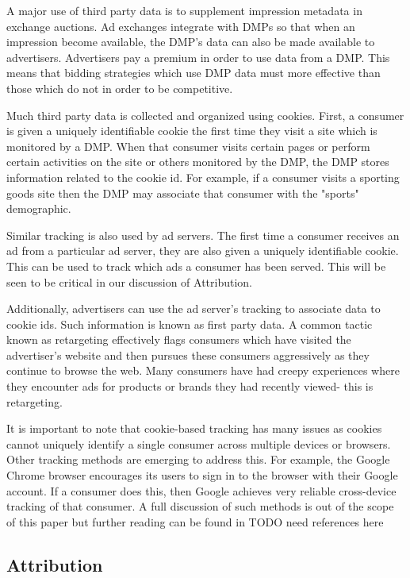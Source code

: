 \documentclass{article}
\begin{document}
A major use of third party data is to supplement impression metadata in exchange auctions. Ad exchanges integrate with DMPs so that when an impression become available, the DMP's data can also be made available to advertisers. Advertisers pay a premium in order to use data from a DMP. This means that bidding strategies which use DMP data must more effective than those which do not in order to be competitive.

Much third party data is collected and organized using cookies. First, a consumer is given a uniquely identifiable cookie the first time they visit a site which is monitored by a DMP. When that consumer visits certain pages or perform certain activities on the site or others monitored by the DMP, the DMP stores information related to the cookie id. For example, if a consumer visits a sporting goods site then the DMP may associate that consumer with the "sports" demographic.

Similar tracking is also used by ad servers. The first time a consumer receives an ad from a particular ad server, they are also given a uniquely identifiable cookie. This can be used to track which ads a consumer has been served. This will be seen to be critical in our discussion of Attribution.

Additionally, advertisers can use the ad server's tracking to associate data to cookie ids. Such information is known as first party data. A common tactic known as retargeting effectively flags consumers which have visited the advertiser's website and then pursues these consumers aggressively as they continue to browse the web. Many consumers have had creepy experiences where they encounter ads for products or brands they had recently viewed- this is retargeting.

It is important to note that cookie-based tracking has many issues as cookies cannot uniquely identify a single consumer across multiple devices or browsers. Other tracking methods are emerging to address this. For example, the Google Chrome browser encourages its users to sign in to the browser with their Google account. If a consumer does this, then Google achieves very reliable cross-device tracking of that consumer. A full discussion of such methods is out of the scope of this paper but further reading can be found in TODO need references here

\subsection{Attribution}
\end{document}
